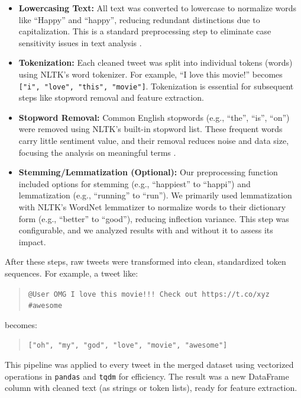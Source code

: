 \begin{itemize}
    \item \textbf{Lowercasing Text:} All text was converted to lowercase to normalize words like ``Happy'' and ``happy'', reducing redundant distinctions due to capitalization. This is a standard preprocessing step to eliminate case sensitivity issues in text analysis .

    \item \textbf{Tokenization:} Each cleaned tweet was split into individual tokens (words) using NLTK's word tokenizer. For example, ``I love this movie!'' becomes \texttt{["i", "love", "this", "movie"]}. Tokenization is essential for subsequent steps like stopword removal and feature extraction.

    \item \textbf{Stopword Removal:} Common English stopwords (e.g., ``the'', ``is'', ``on'') were removed using NLTK’s built-in stopword list. These frequent words carry little sentiment value, and their removal reduces noise and data size, focusing the analysis on meaningful terms .

    \item \textbf{Stemming/Lemmatization (Optional):} Our preprocessing function included options for stemming (e.g., ``happiest'' to ``happi'') and lemmatization (e.g., ``running'' to ``run''). We primarily used lemmatization with NLTK’s WordNet lemmatizer to normalize words to their dictionary form (e.g., ``better'' to ``good''), reducing inflection variance. This step was configurable, and we analyzed results with and without it to assess its impact.
\end{itemize}

\newpage

After these steps, raw tweets were transformed into clean, standardized token sequences. For example, a tweet like:

\begin{quote}
    \small \texttt{@User OMG I love this movie!!! Check out https://t.co/xyz \#awesome}
\end{quote}

becomes:

\begin{quote}
    \small \texttt{["oh", "my", "god", "love", "movie", "awesome"]}
\end{quote}

This pipeline was applied to every tweet in the merged dataset using vectorized operations in \texttt{pandas} and \texttt{tqdm} for efficiency. The result was a new DataFrame column with cleaned text (as strings or token lists), ready for feature extraction.

